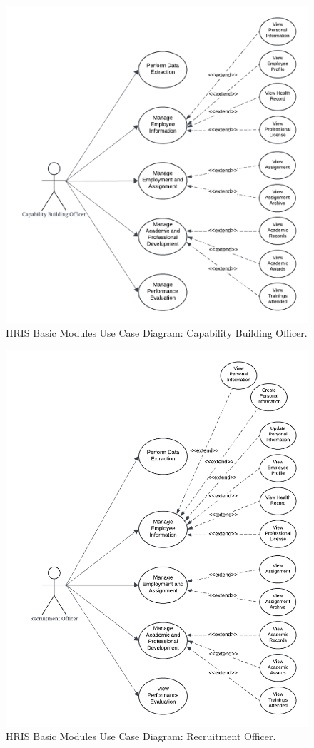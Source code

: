     \begin{figure}[H]
        \centering
        \includegraphics[width=0.9\linewidth]{figures/images/use-case-basic-7.png}
        \caption{HRIS Basic Modules Use Case Diagram: Capability Building Officer.}
        \label{fig:use-case-basic-7}
    \end{figure}

    \begin{figure}[H]
        \centering
        \includegraphics[width=0.9\linewidth]{figures/images/use-case-basic-8.png}
        \caption{HRIS Basic Modules Use Case Diagram: Recruitment Officer.}
        \label{fig:use-case-basic-8}
    \end{figure}

